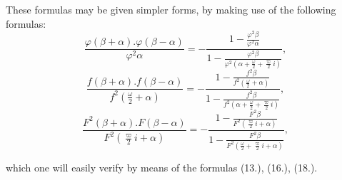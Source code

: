 \documentclass{article}
\begin{document}
These formulas may be given simpler forms, by making use of the following formulas:
\[ \frac{\varphi(\beta+\alpha).\varphi(\beta-\alpha)}{\varphi^{2}\alpha}=-\frac{1-\frac{\varphi^{2}\beta}{\varphi^{2}\alpha}}{1-\frac{\varphi^{2}\beta}{\varphi^{2}\left(\alpha+\frac{\omega}{2}+\frac{\varpi}{2}i\right)}}, \]
\[ \frac{f(\beta+\alpha).f(\beta-\alpha)}{f^{2}\left(\frac{\omega}{2}+\alpha\right)}=-\frac{1-\frac{f^{2}\beta}{f^{2}\left(\frac{\omega}{2}+\alpha\right)}}{1-\frac{f^{2}\beta}{f^{2}\left(\alpha+\frac{\omega}{2}+\frac{\varpi}{2}i\right)}}, \]
\[ \frac{F^{2}(\beta+\alpha).F(\beta-\alpha)}{F^{2}\left(\frac{\varpi}{2}i+\alpha\right)}=-\frac{1-\frac{F^{2}\beta}{F^{2}\left(\frac{\varpi}{2}i+\alpha\right)}}{1-\frac{F^{2}\beta}{F^{2}\left(\frac{\omega}{2}+\frac{\varpi}{2}i+\alpha\right)}}, \]

which one will easily verify by means of the formulas (13.), (16.), (18.).
\end{document}
